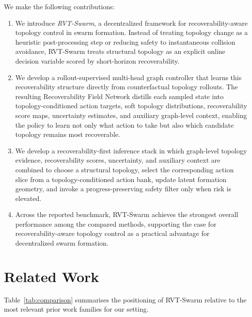 \documentclass{ieeeaccess}
\begin{document}
We make the following contributions:
\begin{enumerate}
    \item We introduce \emph{RVT-Swarm}, a decentralized framework for recoverability-aware topology control in swarm formation. Instead of treating topology change as a heuristic post-processing step or reducing safety to instantaneous collision avoidance, RVT-Swarm treats structural topology as an explicit online decision variable scored by short-horizon recoverability.

    \item We develop a rollout-supervised multi-head graph controller that learns this recoverability structure directly from counterfactual topology rollouts. The resulting Recoverability Field Network distills each sampled state into topology-conditioned action targets, soft topology distributions, recoverability score maps, uncertainty estimates, and auxiliary graph-level context, enabling the policy to learn not only what action to take but also which candidate topology remains most recoverable.

    \item We develop a recoverability-first inference stack in which graph-level topology evidence, recoverability scores, uncertainty, and auxiliary context are combined to choose a structural topology, select the corresponding action slice from a topology-conditioned action bank, update latent formation geometry, and invoke a progress-preserving safety filter only when risk is elevated.

    \item Across the reported benchmark, RVT-Swarm achieves the strongest overall performance among the compared methods, supporting the case for recoverability-aware topology control as a practical advantage for decentralized swarm formation.
\end{enumerate}

\section{Related Work}
\label{sec:related}

Table~\ref{tab:comparison} summarises the positioning of RVT-Swarm relative to the most relevant prior work families for our setting.
\end{document}

